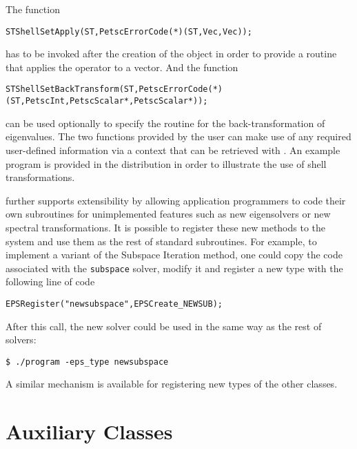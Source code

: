 	The function
	\begin{Verbatim}[fontsize=\small]
      STShellSetApply(ST,PetscErrorCode(*)(ST,Vec,Vec));
	\end{Verbatim}
has to be invoked after the creation of the  object in order to provide a routine that applies the operator to a vector. And the function
	\begin{Verbatim}[fontsize=\small]
      STShellSetBackTransform(ST,PetscErrorCode(*)(ST,PetscInt,PetscScalar*,PetscScalar*));
	\end{Verbatim}
can be used optionally to specify the routine for the back-transformation of eigenvalues. The two functions provided by the user can make use of any required user-defined information via a context that can be retrieved with . An example program is provided in the \slepc distribution in order to illustrate the use of shell transformations.

	\slepc further supports extensibility by allowing application programmers to code their own subroutines for unimplemented features such as new eigensolvers or new spectral transformations. It is possible to register these new methods to the system and use them as the rest of standard subroutines. For example, to implement a variant of the Subspace Iteration method, one could copy the \slepc code associated with the \texttt{subspace} solver, modify it and register a new  type with the following line of code
	\begin{Verbatim}[fontsize=\small]
	EPSRegister("newsubspace",EPSCreate_NEWSUB);
	\end{Verbatim}
After this call, the new solver could be used in the same way as the rest of \slepc solvers:
	\begin{Verbatim}[fontsize=\small]
	$ ./program -eps_type newsubspace
	\end{Verbatim}

	A similar mechanism is available for registering new types of the other classes.

\section{Auxiliary Classes}
\label{sec:sys}

